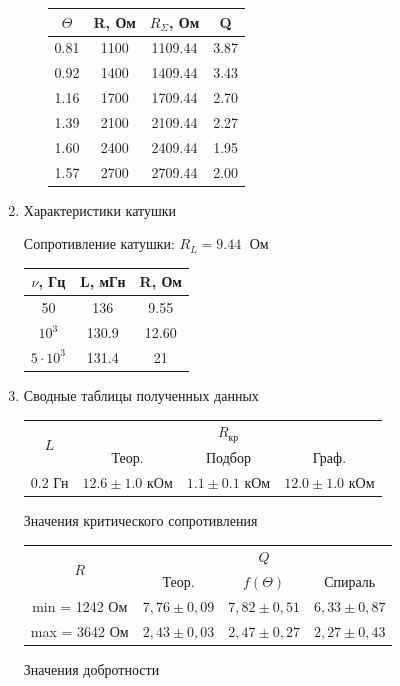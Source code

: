\documentclass[a4paper,12pt]{article}
\begin{document}
\begin{enumerate}
\begin{enumerate}
\begin{center}
\begin{tabular}{|c|c|c|c|}
 \hline 
 $\Theta$ & R, Ом & $R_{\Sigma}$, Ом & Q \\ 
 \hline 
 0.81 & 1100 & 1109.44 & 3.87 \\ 
 \hline 
 0.92 & 1400 & 1409.44 & 3.43 \\ 
 \hline 
 1.16 & 1700 & 1709.44 & 2.70 \\ 
 \hline 
 1.39 & 2100 & 2109.44 & 2.27 \\ 
 \hline 
 1.60 & 2400 & 2409.44 & 1.95 \\ 
 \hline 
 1.57 & 2700 & 2709.44 & 2.00 \\ 
 \hline 
 \end{tabular}
 \end{center}
 
\end{enumerate}
\item Характеристики катушки

 Сопротивление катушки: $R_{L} = 9.44 \;$ Ом
\begin{center}
\begin{tabular}{|c|c|c|}
\hline 
$\nu$, Гц & L, мГн & R, Ом \\ 
\hline 
50 & 136 & 9.55 \\ 
\hline 
$10^3$ & 130.9 & 12.60 \\ 
\hline 
$5 \cdot 10^3$ & 131.4 & 21 \\ 
\hline 
\end{tabular}
\end{center}
\item Сводные таблицы полученных данных 

\begin{table}[h!]
	\centering
	\begin{tabular}{|c|c|c|c|}
		\hline
		\multirow{2}{*}{$L$} & \multicolumn{3}{|c|}{$R_{\text{кр}}$} \\
		\cline{2-4}
		& Теор. & Подбор & Граф.  \\
		\hline
		$ 0.2 $ Гн   & $ 12.6 \pm 1.0 $ кОм & $1.1 \pm 0.1$ кОм & 	$ 12.0 \pm 1.0 $ кОм \\
		\hline
	\end{tabular}
\end{table}

Значения критического сопротивления

\begin{table}[h!]
	\centering
	\begin{tabular}{|c|c|c|c|}
		\hline
		\multirow{2}{*}{$ R $} & \multicolumn{3}{|c|}{$ Q $} \\
		\cline{2-4}
		& Теор. & $ f(\Theta) $ & Спираль \\
		\hline
		min = 1242 Ом & $ 7,76 \pm 0,09 $ & $ 7,82 \pm 0,51 $ & $ 6,33 \pm 0,87 $ \\
		\hline
		max = 3642 Ом  & $ 2,43 \pm 0,03 $ & $ 2,47 \pm 0,27 $  & $ 2,27 \pm 0,43 $ \\
		\hline
	\end{tabular}
\end{table}

Значения добротности 

\end{enumerate}  
\end{document}
